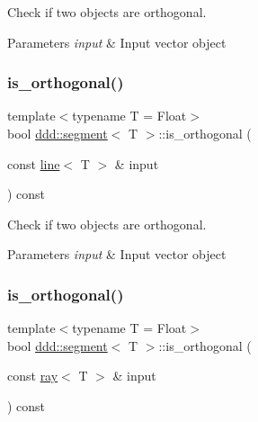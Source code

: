 Check if two objects are orthogonal. 


\begin{DoxyParams}{Parameters}
{\em input} & Input vector object \\
\hline
\end{DoxyParams}
\mbox{\label{classddd_1_1segment_ae4c59be47f1e0946b45e4d0ebe0390c9}} 
\subsubsection{\texorpdfstring{is\+\_\+orthogonal()}{is\_orthogonal()}\hspace{0.1cm}{\footnotesize\ttfamily [2/5]}}
{\footnotesize\ttfamily template$<$typename T = Float$>$ \\
bool \hyperlink{classddd_1_1segment}{ddd\+::segment}$<$ T $>$\+::is\+\_\+orthogonal (\begin{DoxyParamCaption}\item[{const \hyperlink{classddd_1_1line}{line}$<$ T $>$ \&}]{input }\end{DoxyParamCaption}) const\hspace{0.3cm}{\ttfamily [inline]}}



Check if two objects are orthogonal. 


\begin{DoxyParams}{Parameters}
{\em input} & Input vector object \\
\hline
\end{DoxyParams}
\mbox{\label{classddd_1_1segment_a9f639ed78d1b53584ad8966f738497d5}} 
\subsubsection{\texorpdfstring{is\+\_\+orthogonal()}{is\_orthogonal()}\hspace{0.1cm}{\footnotesize\ttfamily [3/5]}}
{\footnotesize\ttfamily template$<$typename T = Float$>$ \\
bool \hyperlink{classddd_1_1segment}{ddd\+::segment}$<$ T $>$\+::is\+\_\+orthogonal (\begin{DoxyParamCaption}\item[{const \hyperlink{classddd_1_1ray}{ray}$<$ T $>$ \&}]{input }\end{DoxyParamCaption}) const\hspace{0.3cm}{\ttfamily [inline]}}



